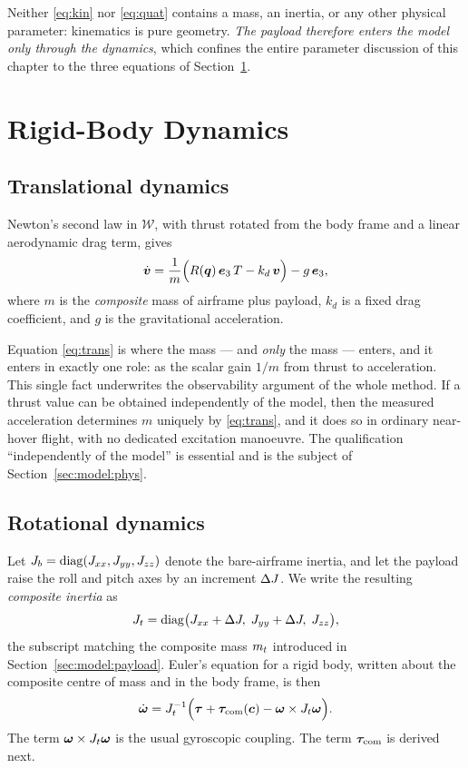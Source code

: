 Neither \eqref{eq:kin} nor \eqref{eq:quat} contains a mass, an inertia, or
any other physical parameter: kinematics is pure geometry. \emph{The
payload therefore enters the model only through the dynamics}, which
confines the entire parameter discussion of this chapter to the three
equations of Section~\ref{sec:model:dyn}.

\section{Rigid-Body Dynamics}\label{sec:model:dyn}

\subsection{Translational dynamics}\label{sec:model:trans}

Newton's second law in $\mathcal{W}$, with thrust rotated from the body
frame and a linear aerodynamic drag term, gives
\begin{equation}
\dot{\bm{v}} = \frac{1}{m}\Bigl( R(\bm{q})\, \bm{e}_3\, T - k_d\, \bm{v} \Bigr) - g\, \bm{e}_3,
\label{eq:trans}
\end{equation}
where $m$ is the \emph{composite} mass of airframe plus payload, $k_d$ is
a fixed drag coefficient, and $g$ is the gravitational acceleration.

Equation \eqref{eq:trans} is where the mass --- and \emph{only} the mass
--- enters, and it enters in exactly one role: as the scalar gain $1/m$
from thrust to acceleration. This single fact underwrites the
observability argument of the whole method. If a thrust value can be
obtained independently of the model, then the measured acceleration
determines $m$ uniquely by \eqref{eq:trans}, and it does so in ordinary
near-hover flight, with no dedicated excitation manoeuvre. The
qualification ``independently of the model'' is essential and is the
subject of Section~\ref{sec:model:phys}.

\subsection{Rotational dynamics}\label{sec:model:rot}

Let $J_b = \mathrm{diag}(J_{xx}, J_{yy}, J_{zz})$ denote the
bare-airframe inertia, and let the payload raise the roll and pitch axes
by an increment $\Delta J$. We write the resulting \emph{composite inertia} as
\begin{equation}
J_t = \mathrm{diag}\bigl(J_{xx} + \Delta J,\; J_{yy} + \Delta J,\; J_{zz}\bigr),
\label{eq:Jt}
\end{equation}
the subscript matching the composite mass $m_t$ introduced in
Section~\ref{sec:model:payload}. Euler's equation for a rigid body,
written about the composite centre of mass and in the body frame, is then
\begin{equation}
\dot{\bm{\omega}} = J_t^{-1}\Bigl( \bm{\tau} + \bm{\tau}_{\mathrm{com}}(\bm{c}) - \bm{\omega} \times J_t \bm{\omega} \Bigr).
\label{eq:rot}
\end{equation}
The term $\bm{\omega} \times J_t \bm{\omega}$ is the usual gyroscopic
coupling. The term $\bm{\tau}_{\mathrm{com}}$ is derived next.

